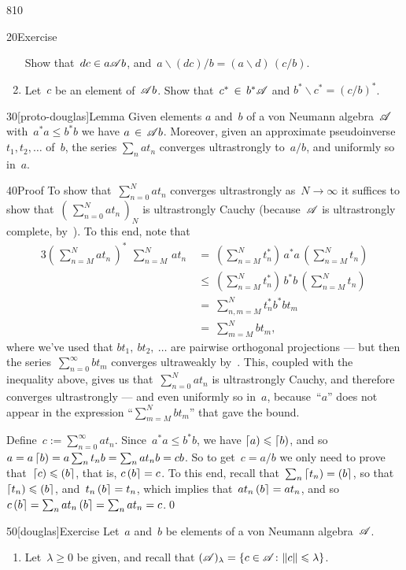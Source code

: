 \begin{parsec}{810}
\begin{point}{20}{Exercise}
\begin{enumerate}
Show that~$dc\in a\mathscr{A} b$,
and~$a\backslash (dc) / b  = (a\backslash d)\,(c/b)$.
\item
Let~$c$ be an element of~$\mathscr{A} b$.
Show that~$c^* \,\in\, b^* \mathscr{A}$
and $b^*\backslash c^* = (c/b)^*$.
\end{enumerate}
\end{point}
\begin{point}{30}[proto-douglas]{Lemma}%
Given elements $a$ and~$b$ of a von Neumann algebra~$\mathscr{A}$
with~$a^*a \leq b^*b$
we have $a\,\in\, \mathscr{A} b$.
Moreover,
given an approximate pseudoinverse $t_1,t_2,\dotsc$
of~$b$,
the series $\sum_nat_n$ converges ultrastrongly to~$a/b$,%
and uniformly so in~$a$.
\begin{point}{40}{Proof}%
To show that~$\sum_{n=0}^N at_n$
converges ultrastrongly as~$N\to \infty$
it suffices
to show that~$(\,\sum_{n=0}^N at_n\,)_N$
is ultrastrongly Cauchy
(because~$\mathscr{A}$ is ultrastrongly complete, by~).
To this end, note that
\begin{alignat*}{3}
\textstyle 
(\, \sum_{n=M}^N at_n\,)^*\ \,\sum_{n=M}^N\,at_n
\ &= \textstyle\ (\sum_{n=M}^Nt_n^*) \,a^*a\, (\sum_{n=M}^N t_n)
\\
\ &\leq\ \textstyle 
 (\sum_{n=M}^N t_n^*) \,b^*b\, (\sum_{n=M}^Nt_n)
\\
\ &= \ \textstyle 
\sum_{n,m=M}^N
t_n^*b^*bt_m 
\\
\ &=\ \textstyle 
\sum_{m=M}^N
bt_m,
\end{alignat*}
where we've used that
$bt_1,\ bt_2,\ \dotsc$
are pairwise orthogonal projections
--- but then the series~$\sum_{n=0}^\infty bt_m$
converges ultraweakly by~.
This, coupled with the
inequality above,
gives us that~$\sum_{n=0}^N at_n$
is ultrastrongly Cauchy,
and therefore converges ultrastrongly --- 
and even uniformly so in~$a$,
because~``$a$'' does not appear in
the expression
``$\sum_{m=M}^N bt_m$'' that gave the bound.

Define~$c:=\sum_{n=0}^\infty at_n$.
Since~$a^*a \leq b^*b$,
we have $\left\lceil a\right)\leqslant \left\lceil b\right)$,
and so~$a=a\left\lceil b\right) = a\sum_n t_n b = \sum_n at_n b = cb$. 
So to get~$c=a/b$
we only need to prove that~$\left\lceil c\right)\leqslant \left(b\right\rceil$,
that is, $c\left(b\right\rceil=c$.
To this end,
recall that~$\sum_n \left\lceil t_n\right)=\left(b\right\rceil$,
so that~$\left\lceil t_n\right)\leqslant \left(b\right\rceil$,
and~$t_n\left(b\right\rceil=t_n$,
which implies
that~$at_n\left(b\right\rceil=at_n$,
and so~$c\left(b\right\rceil=\sum_n at_n\left(b\right\rceil
= \sum_n at_n=c$.\qed

\end{point}
\end{point}
\begin{point}{50}[douglas]{Exercise}%
Let~$a$ and~$b$ be elements of a von Neumann algebra~$\mathscr{A}$.
\begin{enumerate}
\item
Let~$\lambda\geq 0$ be given,
and recall that $(\mathscr{A})_\lambda 
= \{c\in\mathscr{A}\colon \|c\|\leqslant\lambda\}$.


\end{enumerate}
\end{point}
\end{parsec}

